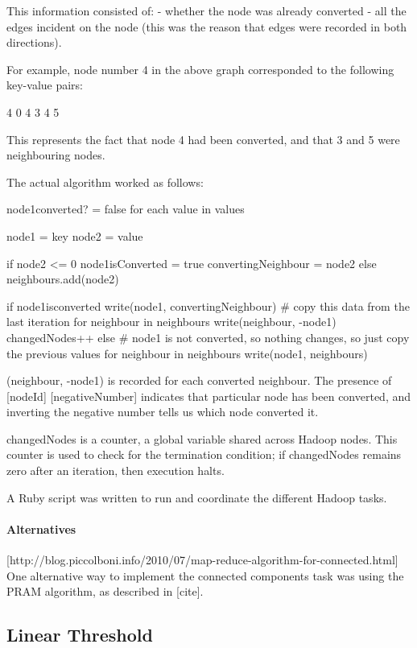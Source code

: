 This information consisted of:
- whether the node was already converted
- all the edges incident on the node (this was the reason that edges were recorded in both directions).

For example, node number 4 in the above graph corresponded to the following key-value pairs:

4 0
4 3
4 5

This represents the fact that node 4 had been converted, and that 3 and 5 were neighbouring nodes.

The actual algorithm worked as follows:

node1converted? = false
for each value in values {
  node1 = key
  node2 = value

  if node2 <= 0 {
    node1isConverted = true
    convertingNeighbour = node2
  } else {
    neighbours.add(node2)
  }
}

if node1isconverted {
  write(node1, convertingNeighbour) # copy this data from the last iteration
  for neighbour in neighbours {
    write(neighbour, -node1)
    changedNodes++
  } 
} else {
    # node1 is not converted, so nothing changes, so just copy the previous values
    for neighbour in neighbours {
      write(node1, neighbours)
    }            
} 

(neighbour, -node1) is recorded for each converted neighbour. The presence of [nodeId] [negativeNumber] indicates that particular node has been converted, and inverting the negative number tells us which node converted it.

changedNodes is a counter, a global variable shared across Hadoop nodes. This counter is used to check for the termination condition; if changedNodes remains zero after an iteration, then execution halts.

A Ruby script was written to run and coordinate the different Hadoop tasks.

\paragraph{Alternatives}

[http://blog.piccolboni.info/2010/07/map-reduce-algorithm-for-connected.html] One alternative way to implement the connected components task was using the PRAM algorithm, as described in [cite]. 

\subsection{Linear Threshold}

